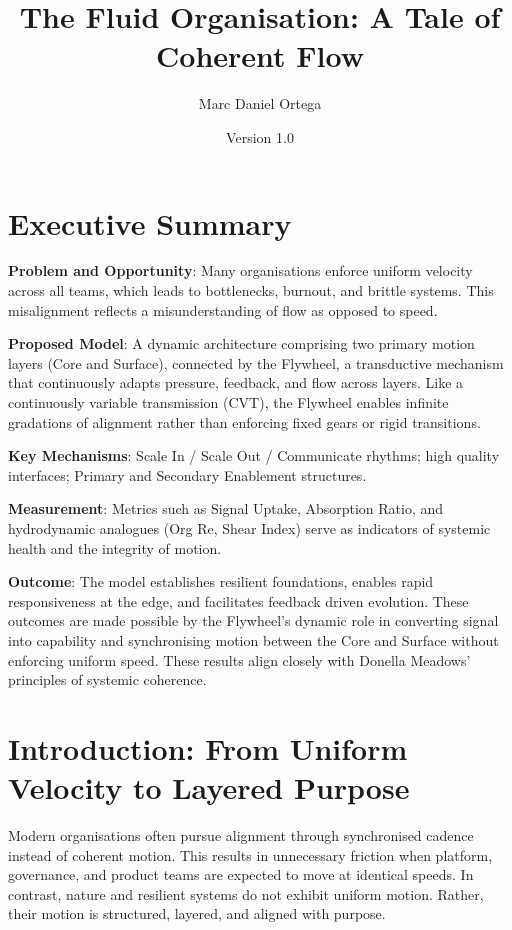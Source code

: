 \documentclass[11pt]{article}
\title{The Fluid Organisation: A Tale of Coherent Flow}
\author{Marc Daniel Ortega}
\date{Version 1.0}
\begin{document}
\maketitle

\tableofcontents
\newpage

\section*{Executive Summary}
\textbf{Problem and Opportunity}: Many organisations enforce uniform velocity across all teams, which leads to bottlenecks, burnout, and brittle systems. This misalignment reflects a misunderstanding of flow as opposed to speed.

\textbf{Proposed Model}: A dynamic architecture comprising two primary motion layers (Core and Surface), connected by the Flywheel, a transductive mechanism that continuously adapts pressure, feedback, and flow across layers. Like a continuously variable transmission (CVT), the Flywheel enables infinite gradations of alignment rather than enforcing fixed gears or rigid transitions.

\textbf{Key Mechanisms}: Scale In / Scale Out / Communicate rhythms; high quality interfaces; Primary and Secondary Enablement structures.

\textbf{Measurement}: Metrics such as Signal Uptake, Absorption Ratio, and hydrodynamic analogues (Org Re, Shear Index) serve as indicators of systemic health and the integrity of motion.

\textbf{Outcome}: The model establishes resilient foundations, enables rapid responsiveness at the edge, and facilitates feedback driven evolution. These outcomes are made possible by the Flywheel's dynamic role in converting signal into capability and synchronising motion between the Core and Surface without enforcing uniform speed. These results align closely with Donella Meadows' principles of systemic coherence.

\newpage

\section{Introduction: From Uniform Velocity to Layered Purpose}
Modern organisations often pursue alignment through synchronised cadence instead of coherent motion. This results in unnecessary friction when platform, governance, and product teams are expected to move at identical speeds. In contrast, nature and resilient systems do not exhibit uniform motion. Rather, their motion is structured, layered, and aligned with purpose.
\end{document}
